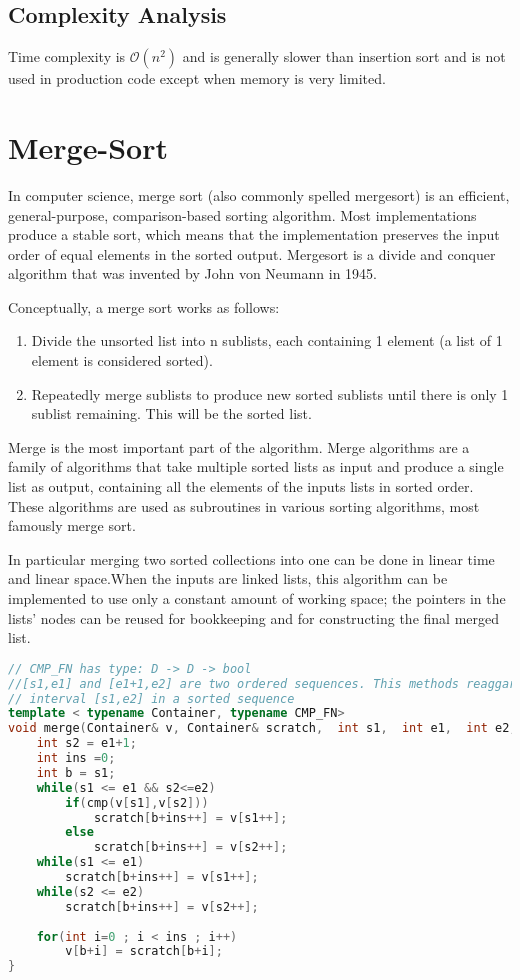 \subsection{Complexity Analysis}
Time complexity is  $\mathcal{O}(n^2)$ and is generally slower than insertion sort and is not used in production code except when memory is very limited.





\section{Merge-Sort}
In computer science, merge sort (also commonly spelled mergesort) is an efficient, general-purpose, comparison-based sorting algorithm. Most implementations produce a stable sort, which means that the implementation preserves the input order of equal elements in the sorted output. Mergesort is a divide and conquer algorithm that was invented by John von Neumann in 1945.

Conceptually, a merge sort works as follows:
\begin{enumerate}
\item Divide the unsorted list into n sublists, each containing 1 element (a list of 1 element is considered sorted).
\item Repeatedly merge sublists to produce new sorted sublists until there is only 1 sublist remaining. This will be the sorted list.
\end{enumerate} 

Merge is the most important part of the algorithm. Merge algorithms are a family of algorithms that take multiple sorted lists as input and produce a single list as output, containing all the elements of the inputs lists in sorted order. These algorithms are used as subroutines in various sorting algorithms, most famously merge sort.

In particular merging two sorted collections into one can be done in linear time and linear space.When the inputs are linked lists, this algorithm can be implemented to use only a constant amount of working space; the pointers in the lists' nodes can be reused for bookkeeping and for constructing the final merged list.

\begin{lstlisting}[language=c++, caption="Bubble-sort implementation in C++14"]
// CMP_FN has type: D -> D -> bool
//[s1,e1] and [e1+1,e2] are two ordered sequences. This methods reaggarne the whole
// interval [s1,e2] in a sorted sequence
template < typename Container, typename CMP_FN>
void merge(Container& v, Container& scratch,  int s1,  int e1,  int e2,CMP_FN cmp){
    int s2 = e1+1;
    int ins =0;
    int b = s1;
    while(s1 <= e1 && s2<=e2)
        if(cmp(v[s1],v[s2]))
            scratch[b+ins++] = v[s1++];
        else
            scratch[b+ins++] = v[s2++];
    while(s1 <= e1)
        scratch[b+ins++] = v[s1++];
    while(s2 <= e2)
        scratch[b+ins++] = v[s2++];
        
    for(int i=0 ; i < ins ; i++)
        v[b+i] = scratch[b+i];
}
\end{lstlisting}


